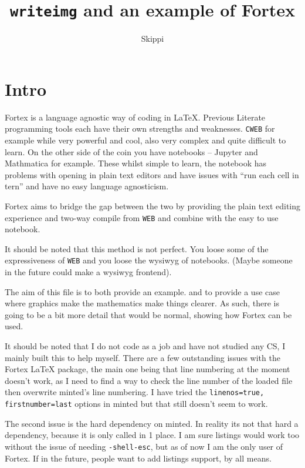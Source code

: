 \documentclass[a4paper]{article}
\title{\texttt{writeimg} and an example of Fortex}
\author{Skippi}
\begin{document}
\maketitle{} 

\section{Intro}

Fortex is a language agnostic way of coding in \LaTeX{}. Previous Literate programming tools each have their own strengths and weaknesses. \texttt{CWEB} for example while very powerful and cool, also very complex and quite difficult to learn. On the other side of the coin you have notebooks -- Jupyter and Mathmatica for example. These whilst simple to learn, the notebook has problems with opening in plain text editors and have issues with ``run each cell in tern'' and have no easy language agnosticism. 

Fortex aims to bridge the gap between the two by providing the plain text editing experience and two-way compile from \texttt{WEB} and combine with the easy to use notebook. 

It should be noted that this method is not perfect. You loose some of the expressiveness of \texttt{WEB} and you loose the wysiwyg of notebooks. (Maybe someone in the future could make a wysiwyg frontend).

The aim of this file is to both provide an example. and to provide a use case where graphics make the mathematics make things clearer. As such, there is going to be a bit more detail that would be normal, showing how Fortex can be used.

It should be noted that I do not code as a job and have not studied any CS, I mainly built this to help myself. There are a few outstanding issues with the Fortex \LaTeX{} package, the main one being that line numbering at the moment doesn't work, as I need to find a way to check the line number of the loaded file then overwrite minted's line numbering. I have tried the \texttt{linenos=true, firstnumber=last} options in minted but that still doesn't seem to work.

The second issue is the hard dependency on minted. In reality its not that hard a dependency, because it is only called in 1 place. I am sure listings would work too without the issue of needing \texttt{-shell-esc}, but as of now I am the only user of Fortex. If in the future, people want to add listings support, by all means. 
\end{document}
